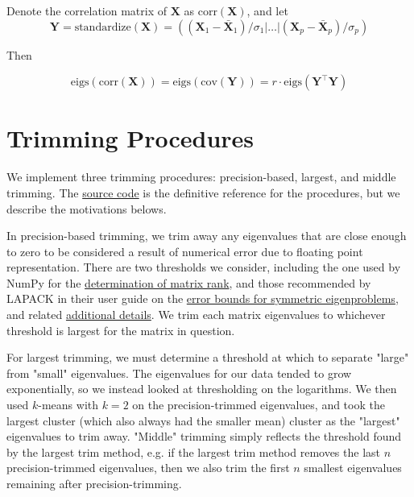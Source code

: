 \documentclass[12pt]{spieman}  %
\begin{document}
\begin{spacing}{2}
Denote the correlation matrix of \(\mathbf{X}\) as \(\text{corr}(\mathbf{X})\), and let
\[
\mathbf{Y} = \text{standardize}(\mathbf{X}) =
\left(
(\mathbf{X}_1 - \bar{\mathbf{X}}_1) / \sigma_1 | \dots | (\mathbf{X}_p - \bar{\mathbf{X}}_p) / \sigma_p
\right)
\]

Then

\[
\text{eigs}\left( \text{corr}(\mathbf{X})  \right)
= \text{eigs}\left( \text{cov}(\mathbf{Y})  \right)
= r \cdot \text{eigs}(\mathbf{Y}^{\top}\mathbf{Y})
\]

\section{Trimming Procedures}
\label{sec:trimming}

We implement three trimming procedures: precision-based, largest, and middle
trimming. The
\href{https://github.com/DM-Berger/random-matrix-fmri/blob/7c9e4187f582dedee728cd7193b8894d928c2f00/code/rmt/updated_dataset.py#L431-L444}{source
code} is the definitive reference for the procedures, but we describe the
motivations belows.

In precision-based trimming, we trim away any eigenvalues that are close enough
to zero to be considered a result of numerical error due to floating point
representation. There are two thresholds we consider, including the one used by
NumPy\cite{harrisArrayProgrammingNumPy2020} for the
\href{https://numpy.org/doc/stable/reference/generated/numpy.linalg.matrix_rank.html}{determination
of matrix rank}, and those recommended by LAPACK\cite{laug} in their user
guide\cite{andersonLAPACKUsersGuide1999a} on the
\href{https://netlib.org/lapack/lug/node89.html}{error bounds for symmetric
eigenproblems}, and related
\href{https://netlib.org/lapack/lug/node90.html}{additional details}. We trim
each matrix eigenvalues to whichever threshold is largest for the matrix in
question.

For largest trimming, we must determine a threshold at which to separate
"large" from "small" eigenvalues. The eigenvalues for our data tended to grow
exponentially, so we instead looked at thresholding on the logarithms. We then
used \(k\)-means with \(k=2\) on the precision-trimmed eigenvalues, and took
the largest cluster (which also always had the smaller mean) cluster as the
"largest" eigenvalues to trim away. "Middle" trimming simply reflects the
threshold found by the largest trim method, e.g. if the largest trim method
removes the last \(n\) precision-trimmed eigenvalues, then we also trim the
first \(n\) smallest eigenvalues remaining after precision-trimming.


\end{spacing}
\end{document}
